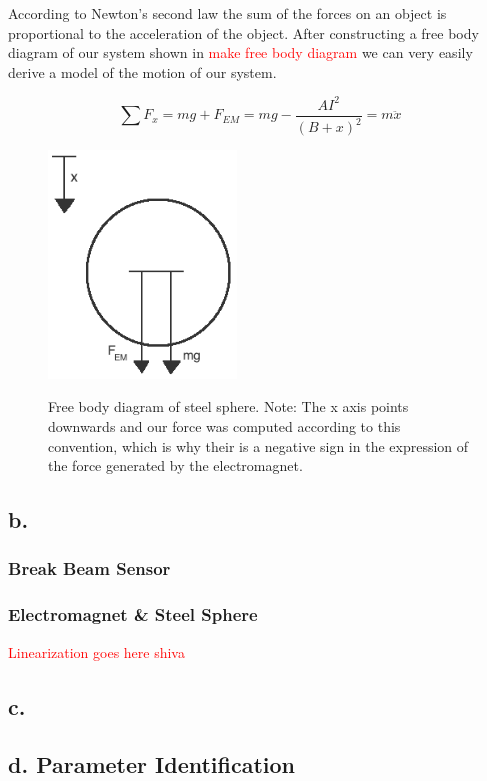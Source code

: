 \documentclass{article}
\newcommand{\xxx}[1]{\textcolor{red}{#1}}
\theoremstyle{plain}
\theoremstyle{definition}
\theoremstyle{remark}
\begin{document}
According to Newton's second law the sum of the forces on an object is proportional to the acceleration of the object.  After constructing a free body diagram of our system shown in \xxx{make free body diagram} we can very easily derive a model of the motion of our system.

$$ \sum F_x = mg + F_{EM} = mg -\frac{A I^2}{(B+x)^2} = m  \ddot{x}$$

\begin{figure}
\begin{center}
\includegraphics[width = 5cm]{freebodydiagram.png}
\label{Q1_a4}
\caption{Free body diagram of steel sphere.  Note: The x axis points downwards and our force was computed according to this convention, which is why their is a negative sign in the expression of the force generated by the electromagnet.}
\end{center}
\end{figure}

\subsection*{b.}
\subsubsection{Break Beam Sensor}

\subsubsection{Electromagnet \& Steel Sphere}
\xxx{Linearization goes here shiva}

\subsection*{c.}

\subsection*{d. Parameter Identification}
\end{document}
